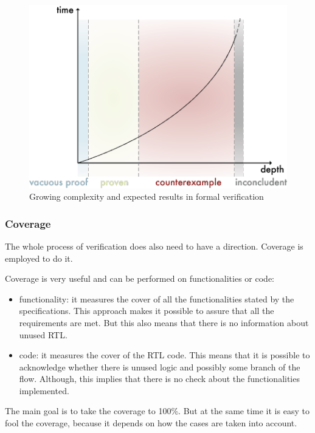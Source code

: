 \begin{figure}[H]
    \centering
    \includegraphics[scale = 0.65]{Chapter_1/img/for-com.png}
    \caption{Growing complexity and expected results in formal verification}
    \label{for-com}
\end{figure}




\subsubsection{Coverage}
The whole process of verification does also need to have a direction. Coverage is employed to do it.

Coverage is very useful and can be performed on functionalities or code:
\begin{itemize}
    \item functionality: it measures the cover of all the functionalities stated by the specifications. This approach makes it possible to assure that all the requirements are met. But this also means that there is no information about unused RTL.
    
    \item code: it measures the cover of the RTL code. This means that it is possible to acknowledge whether there is unused logic and possibly some branch of the flow. Although, this implies that there is no check about the functionalities implemented.

\end{itemize}

The main goal is to take the coverage to 100\%. But at the same time it is easy to fool the coverage, because it depends on how the cases are taken into account.

